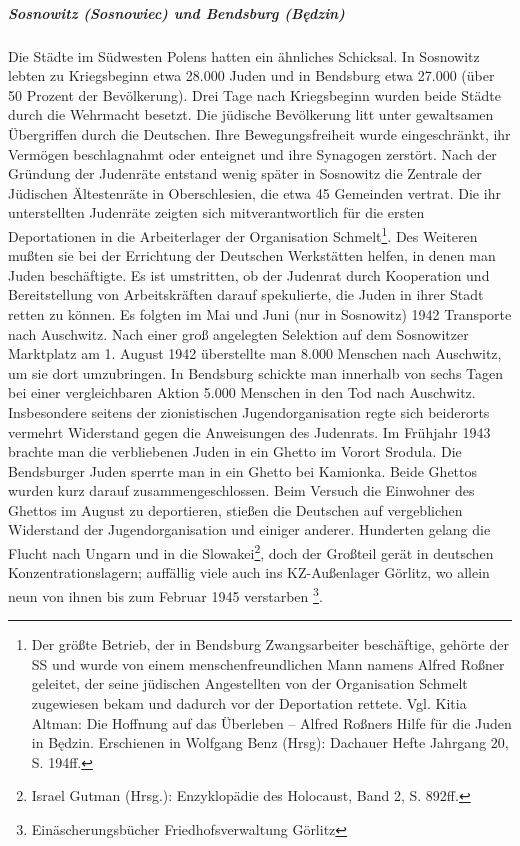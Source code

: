 \documentclass[a4paper,12pt,ngerman,
]{nisebook}
\begin{document}
\subparagraph{Sosnowitz (Sosnowiec) und Bendsburg (Będzin)} Die Städte im Südwesten Polens hatten ein ähnliches Schicksal. In Sosnowitz lebten zu Kriegsbeginn etwa 28.000 Juden und in Bendsburg etwa 27.000 (über 50 Prozent der Bevölkerung). Drei Tage nach Kriegsbeginn wurden beide Städte durch die Wehrmacht besetzt. Die jüdische Bevölkerung litt unter gewaltsamen Übergriffen durch die Deutschen. Ihre Bewegungsfreiheit wurde eingeschränkt, ihr Vermögen beschlagnahmt oder enteignet und ihre Synagogen zerstört. Nach der Gründung der Judenräte entstand wenig später in Sosnowitz die \glqq Zentrale der Jüdischen Ältestenräte in Oberschlesien\grqq, die etwa 45 Gemeinden vertrat. Die ihr unterstellten Judenräte zeigten sich mitverantwortlich für die ersten Deportationen in die Arbeiterlager der Organisation Schmelt\footnote{Der größte Betrieb, der in Bendsburg Zwangsarbeiter beschäftige, gehörte der SS und wurde von einem menschenfreundlichen Mann namens Alfred Roßner geleitet, der seine jüdischen Angestellten von der Organisation Schmelt zugewiesen bekam und dadurch vor der Deportation rettete. Vgl. Kitia Altman: Die Hoffnung auf das Überleben -- Alfred Roßners Hilfe für die Juden in Będzin. Erschienen in Wolfgang Benz (Hrsg): Dachauer Hefte Jahrgang 20, S. 194ff.}. Des Weiteren mußten sie bei der Errichtung der Deutschen Werkstätten helfen, in denen man Juden beschäftigte. Es ist umstritten, ob der Judenrat durch Kooperation und Bereitstellung von Arbeitskräften darauf spekulierte, die Juden in ihrer Stadt retten zu können. Es folgten im Mai und Juni (nur in Sosnowitz) 1942 Transporte nach Auschwitz. Nach einer groß angelegten Selektion auf dem Sosnowitzer Marktplatz am 1. August 1942 überstellte man 8.000 Menschen nach Auschwitz, um sie dort umzubringen. In Bendsburg schickte man innerhalb von sechs Tagen bei einer vergleichbaren Aktion 5.000 Menschen in den Tod nach Auschwitz. Insbesondere seitens der zionistischen Jugendorganisation regte sich beiderorts vermehrt Widerstand gegen die Anweisungen des Judenrats. Im Frühjahr 1943 brachte man die verbliebenen Juden in ein Ghetto im Vorort Srodula. Die Bendsburger Juden sperrte man in ein Ghetto bei Kamionka. Beide Ghettos wurden kurz darauf zusammengeschlossen. Beim Versuch die Einwohner des Ghettos im August zu deportieren, stießen die Deutschen auf vergeblichen Widerstand der Jugendorganisation und einiger anderer. Hunderten gelang die Flucht nach Ungarn und in die Slowakei\footnote{Israel Gutman (Hrsg.): Enzyklopädie des Holocaust, Band 2, S. 892ff.}, doch der Großteil gerät in deutschen Konzentrationslagern; auffällig viele auch ins KZ-Außenlager Görlitz, wo allein neun von ihnen bis zum Februar 1945 verstarben \footnote{Einäscherungsbücher Friedhofsverwaltung Görlitz}.
\end{document}
